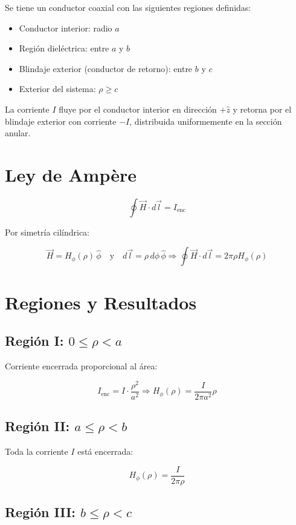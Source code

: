 \documentclass[11pt]{article}
\begin{document}
Se tiene un conductor coaxial con las siguientes regiones definidas:

\begin{itemize}
    \item Conductor interior: radio \( a \)
    \item Región dieléctrica: entre \( a \) y \( b \)
    \item Blindaje exterior (conductor de retorno): entre \( b \) y \( c \)
    \item Exterior del sistema: \( \rho \geq c \)
\end{itemize}

La corriente \( I \) fluye por el conductor interior en dirección \( +\hat{z} \) y retorna por el blindaje exterior con corriente \( -I \), distribuida uniformemente en la sección anular.

\section*{Ley de Ampère}

\[
\oint \vec{H} \cdot d\vec{l} = I_{\text{enc}}
\]

Por simetría cilíndrica:

\[
\vec{H} = H_\phi(\rho)\, \hat{\phi} \quad \text{y} \quad d\vec{l} = \rho\, d\phi\, \hat{\phi}
\Rightarrow \oint \vec{H} \cdot d\vec{l} = 2\pi \rho H_\phi(\rho)
\]

\section*{Regiones y Resultados}

\subsection*{Región I: \( 0 \leq \rho < a \)}

Corriente encerrada proporcional al área:

\[
I_{\text{enc}} = I \cdot \frac{\rho^2}{a^2}
\Rightarrow
H_\phi(\rho) = \frac{I}{2\pi a^2} \rho
\]

\subsection*{Región II: \( a \leq \rho < b \)}

Toda la corriente \( I \) está encerrada:

\[
H_\phi(\rho) = \frac{I}{2\pi \rho}
\]

\subsection*{Región III: \( b \leq \rho < c \)}
\end{document}
